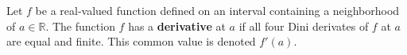 Let $f$ be a real-valued function defined on an interval containing a neighborhood of $a \in \mathbb{R}$. The function $f$ has a \textbf{derivative} at $a$ if all four Dini derivates of $f$ at $a$ are equal and finite. This common value is denoted $f'(a)$.
